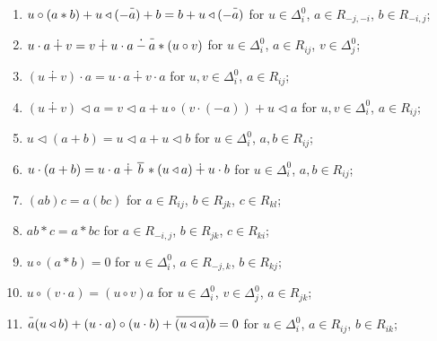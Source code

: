 \documentclass{article}
\theoremstyle{definition}
\newcommand{\dotminus}{\mathbin{\dot{-}}}
\newcommand{\inv}[1]{
    \!\;\overline{
        \!\!\:#1\vphantom !\!\!\:
    }\;\!
}
\begin{document}
\begin{enumerate}[label = {(R\arabic*)}]
    \item \label{cir-str-b1} \(
        u \circ (a * b)
        + u \triangleleft (-\inv a)
        + b
        =
         b
        + u \triangleleft (-\inv a)
    \) for \(u \in \Delta^0_i\), \(a \in R_{-j, -i}\), \(b \in R_{-i, j}\);

    \item \label{dot-cen} \(
        u \cdot a
        \dotplus v
        =
        v
        \dotplus u \cdot a
        \dotminus \inv a * (u \circ v)
    \) for \(u \in \Delta^0_i\), \(a \in R_{ij}\), \(v \in \Delta^0_j\);

    \item \label{dot-dis-l} \(
        (u \dotplus v) \cdot a
        =
        u \cdot a
        \dotplus v \cdot a
    \) for \(u, v \in \Delta^0_i\), \(a \in R_{ij}\);

    \item \label{tri-dis-l} \(
        (u \dotplus v) \triangleleft a
        =
        v \triangleleft a
        + u \circ (v \cdot (-a))
        + u \triangleleft a
    \) for \(u, v \in \Delta^0_i\), \(a \in R_{ij}\);

    \item \label{tri-dis-r} \(
        u \triangleleft (a + b)
        =
        u \triangleleft a
        + u \triangleleft b
    \) for \(u \in \Delta^0_i\), \(a, b \in R_{ij}\);

    \item \label{dot-dis-r} \(
        u \cdot (a + b)
        =
        u \cdot a
        \dotplus \inv{\,b\,} * (u \triangleleft a)
        \dotplus u \cdot b
    \) for \(u \in \Delta^0_i\), \(a, b \in R_{ij}\);

    \item \label{mul-ass} \(
        (ab)c = a(bc)
    \) for \(a \in R_{ij}\), \(b \in R_{jk}\), \(c \in R_{kl}\);

    \item \label{str-ass} \(
        ab * c = a * bc
    \) for \(a \in R_{-i, j}\), \(b \in R_{jk}\), \(c \in R_{ki}\);

    \item \label{cir-str-b2} \(
        u \circ (a * b) = 0
    \) for \(u \in \Delta^0_i\), \(a \in R_{-j, k}\), \(b \in R_{kj}\);

    \item \label{cir-dot} \(
        u \circ (v \cdot a) = (u \circ v) a
    \) for \(u \in \Delta^0_i\), \(v \in \Delta^0_j\), \(a \in R_{jk}\);

    \item \label{inv-tri} \(
        \inv a (u \triangleleft b)
        + (u \cdot a) \circ (u \cdot b)
        + \inv{ (u \triangleleft a) } b
        = 0
    \) for \(u \in \Delta^0_i\), \(a \in R_{ij}\), \(b \in R_{ik}\);


\end{enumerate}
\end{document}
